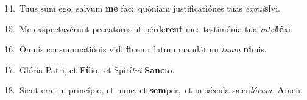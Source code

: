 {\numbfont\textcolor{\numbcolor}{14.}}~Tuus sum ego, salvum \textbf{me} fac:~\star quóniam justificatiónes tuas \textit{ex}\-\textit{qui}\textbf{sí}vi.\par
{\numbfont\textcolor{\numbcolor}{15.}}~Me exspectavérunt peccatóres ut pérde\textbf{rent} me:~\star testimónia tua \textit{in}\-\textit{tel}\textbf{lé}xi.\par
{\numbfont\textcolor{\numbcolor}{16.}}~Omnis consummatiónis vidi \textbf{fi}\-nem:~\star latum mandátum \textit{tu}\-\textit{um} \textbf{ni}\-mis.\par
{\numbfont\textcolor{\numbcolor}{17.}}~Glória Patri, et \textbf{Fí}\-lio,~\star et Spirí\-\textit{tu}\-\textit{i} \textbf{Sanc}\-to.\par
{\numbfont\textcolor{\numbcolor}{18.}}~Sicut erat in princípio, et nunc, et \textbf{sem}\-per,~\star et in sǽcula sæcu\-\textit{ló}\-\textit{rum}. \textbf{A}\-men.\par
